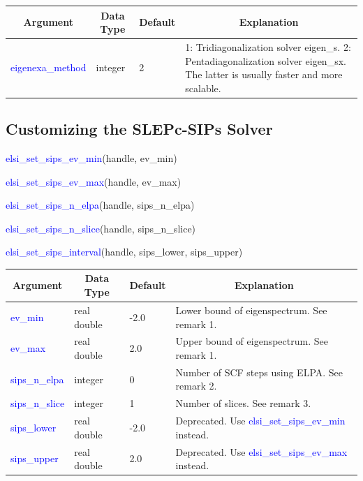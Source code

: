 \documentclass{report}
\begin{document}
\begin{tabular}[]{|p{30mm}|p{20mm}|p{15mm}|p{100mm}|}
\hline
\multicolumn{1}{|c|}{\textbf{Argument}} & \multicolumn{1}{c|}{\textbf{Data Type}} & \multicolumn{1}{c|}{\textbf{Default}} & \multicolumn{1}{c|}{\textbf{Explanation}}\\
\hline
\textcolor{blue}{eigenexa\_method} & integer & 2 & 1: Tridiagonalization solver eigen\_s. 2: Pentadiagonalization solver eigen\_sx. The latter is usually faster and more scalable.\\
\hline
\end{tabular}

\subsection{Customizing the SLEPc-SIPs Solver}
\label{subsec:setter_sips}
\begin{labeling}{\hspace{6cm}}
\item [\hspace{0.3cm} \textcolor{blue}{elsi\_set\_sips\_ev\_min}(handle, ev\_min)]
\item [\hspace{0.3cm} \textcolor{blue}{elsi\_set\_sips\_ev\_max}(handle, ev\_max)]
\item [\hspace{0.3cm} \textcolor{blue}{elsi\_set\_sips\_n\_elpa}(handle, sips\_n\_elpa)]
\item [\hspace{0.3cm} \textcolor{blue}{elsi\_set\_sips\_n\_slice}(handle, sips\_n\_slice)]
\item [\hspace{0.3cm} \textcolor{blue}{elsi\_set\_sips\_interval}(handle, sips\_lower, sips\_upper)]
\end{labeling}

\begin{tabular}[]{|p{30mm}|p{20mm}|p{15mm}|p{100mm}|}
\hline
\multicolumn{1}{|c|}{\textbf{Argument}} & \multicolumn{1}{c|}{\textbf{Data Type}} & \multicolumn{1}{c|}{\textbf{Default}} & \multicolumn{1}{c|}{\textbf{Explanation}}\\
\hline
\textcolor{blue}{ev\_min}        & real double & -2.0 & Lower bound of eigenspectrum. See remark 1.\\
\hline
\textcolor{blue}{ev\_max}        & real double & 2.0  & Upper bound of eigenspectrum. See remark 1.\\
\hline
\textcolor{blue}{sips\_n\_elpa}  & integer     & 0    & Number of SCF steps using ELPA. See remark 2.\\
\hline
\textcolor{blue}{sips\_n\_slice} & integer     & 1    & Number of slices. See remark 3.\\
\hline
\textcolor{blue}{sips\_lower}    & real double & -2.0 & Deprecated. Use \textcolor{blue}{elsi\_set\_sips\_ev\_min} instead.\\
\hline
\textcolor{blue}{sips\_upper}    & real double & 2.0  & Deprecated. Use \textcolor{blue}{elsi\_set\_sips\_ev\_max} instead.\\
\hline
\end{tabular}
\end{document}
